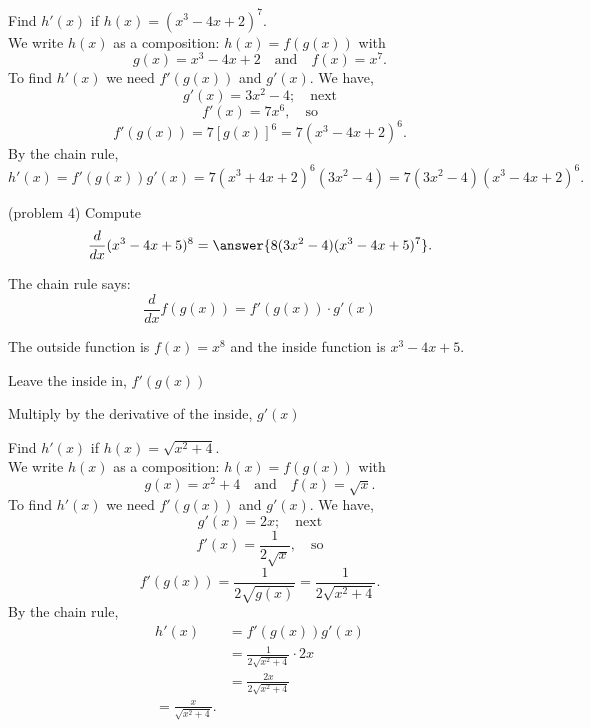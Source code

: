 \documentclass{ximera}
\begin{document}
\begin{example}[example 4]

Find $h'(x)$ if $h(x) = (x^3 - 4x + 2)^7$.\\
We write $h(x)$ as a composition: $h(x)=f(g(x))$ with 
\[
g(x) = x^3 - 4x + 2  \quad \text{and} \quad  f(x) = x^7.
\]
To find $h'(x)$ we need $f'(g(x))$ and $g'(x)$.  We have,
\[
g'(x) =3x^2 - 4; \quad \text{next} 
\]
\[
f'(x) = 7x^6 , \quad \text{so}
\]
\[
f'(g(x)) = 7[g(x)]^6 = 7(x^3 - 4x + 2)^6 .
\]
By the chain rule,
\[
h'(x) = f'(g(x))g'(x) = 7(x^3 + 4x + 2)^6(3x^2 - 4)=7(3x^2 - 4)(x^3 - 4x + 2)^6.
\]
\end{example}

\begin{center}
\begin{foldable}
\end{foldable}
\end{center}




\begin{problem}(problem 4)
  Compute
  \[
  \frac{d}{dx} (x^3 - 4x + 5)^8 = \answer{8(3x^2 - 4)(x^3 - 4x + 5)^7 }.
  \]
  
    \begin{hint}
      The chain rule says:
      \[
      \frac{d}{dx} f(g(x)) = f'(g(x))\cdot g'(x)
      \]
    \end{hint}
    \begin{hint}
      The outside function is $f(x) = x^8$ and the inside
      function is $x^3 - 4x + 5$.
    \end{hint}
    \begin{hint}
		  Leave the inside in, $f'(g(x))$
		\end{hint}
		\begin{hint}
		  Multiply by the derivative of the inside, $g'(x)$
		\end{hint}
    
\end{problem}




\begin{example}[example 5]

Find $h'(x)$ if $h(x) = \sqrt{x^2 + 4}$.\\
We write $h(x)$ as a composition: $h(x)=f(g(x))$ with 
\[
g(x) = x^2 + 4  \quad \text{and} \quad  f(x) = \sqrt x.
\] 
To find $h'(x)$ we need $f'(g(x))$ and $g'(x)$.  We have,
\[
g'(x) = 2x; \quad \text{next} 
\]
\[
f'(x) = \frac{1}{2\sqrt x} , \quad \text{so}
\] 
\[
f'(g(x)) = \frac{1}{2\sqrt {g(x)}}=\frac{1}{2\sqrt {x^2 + 4}}.
\]
By the chain rule,
\begin{align*}
h'(x) &= f'(g(x))g'(x)\\
&= \frac{1}{2\sqrt {x^2 + 4}}\cdot 2x\\
&= \frac{2x}{2\sqrt {x^2 + 4}}\\
=\frac{x}{\sqrt {x^2 + 4}}.
\end{align*}
\end{example}
\end{document}
